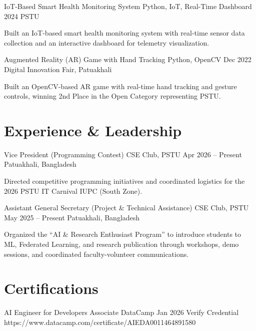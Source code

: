 \documentclass[11pt, a4paper]{article}
\begin{document}
\cvProject
    {IoT-Based Smart Health Monitoring System}
    {Python, IoT, Real-Time Dashboard}
    {2024}
    {PSTU}
    {
        \item Built an IoT-based smart health monitoring system with real-time sensor data collection and an interactive dashboard for telemetry visualization.
    }

\cvProject
    {Augmented Reality (AR) Game with Hand Tracking}
    {Python, OpenCV}
    {Dec 2022}
    {Digital Innovation Fair, Patuakhali}
    {
        \item Built an OpenCV-based AR game with real-time hand tracking and gesture controls, winning 2nd Place in the Open Category representing PSTU.
    }


\section{Experience \& Leadership}
\cvExperience
    {Vice President (Programming Contest)}
    {CSE Club, PSTU}
    {Apr 2026 -- Present}
    {Patuakhali, Bangladesh}
    {
        \item Directed competitive programming initiatives and coordinated logistics for the 2026 PSTU IT Carnival IUPC (South Zone).
    }

\cvExperience
    {Assistant General Secretary (Project \& Technical Assistance)}
    {CSE Club, PSTU}
    {May 2025 -- Present}
    {Patuakhali, Bangladesh}
    {
        \item Organized the ``AI \& Research Enthusiast Program'' to introduce students to ML, Federated Learning, and research publication through workshops, demo sessions, and coordinated faculty-volunteer communications.
    }


\section{Certifications}
\cvCert
    {AI Engineer for Developers Associate}
    {DataCamp}
    {Jan 2026}
    {Verify Credential}
    {https://www.datacamp.com/certificate/AIEDA0011464891580}
\end{document}
